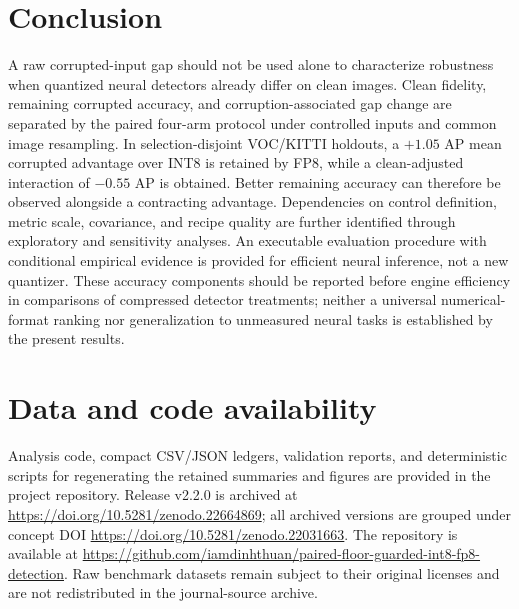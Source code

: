 \documentclass[a4paper,fleqn]{cas-dc}
\begin{document}
\section{Conclusion}
\label{sec:conclusion}

A raw corrupted-input gap should not be used alone to characterize robustness when quantized neural detectors already differ on clean images. Clean fidelity, remaining corrupted accuracy, and corruption-associated gap change are separated by the paired four-arm protocol under controlled inputs and common image resampling. In selection-disjoint VOC/KITTI holdouts, a $+1.05$ AP mean corrupted advantage over INT8 is retained by FP8, while a clean-adjusted interaction of $-0.55$ AP is obtained. Better remaining accuracy can therefore be observed alongside a contracting advantage. Dependencies on control definition, metric scale, covariance, and recipe quality are further identified through exploratory and sensitivity analyses. An executable evaluation procedure with conditional empirical evidence is provided for efficient neural inference, not a new quantizer. These accuracy components should be reported before engine efficiency in comparisons of compressed detector treatments; neither a universal numerical-format ranking nor generalization to unmeasured neural tasks is established by the present results.

\FloatBarrier

\section*{Data and code availability}

Analysis code, compact CSV/JSON ledgers, validation reports, and deterministic scripts for regenerating the retained summaries and figures are provided in the project repository. Release v2.2.0 is archived at \url{https://doi.org/10.5281/zenodo.22664869}; all archived versions are grouped under concept DOI \url{https://doi.org/10.5281/zenodo.22031663}. The repository is available at \url{https://github.com/iamdinhthuan/paired-floor-guarded-int8-fp8-detection}. Raw benchmark datasets remain subject to their original licenses and are not redistributed in the journal-source archive.
\end{document}
